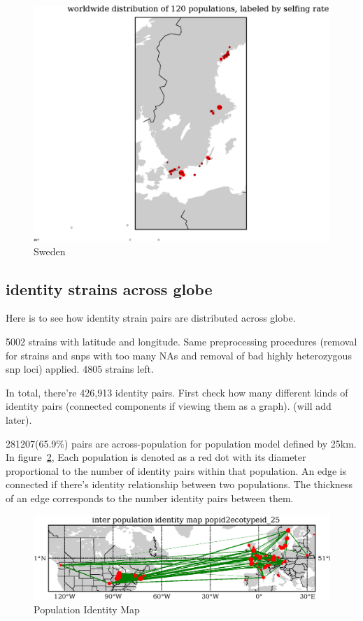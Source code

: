 \documentclass[a4paper,10pt]{article}
\begin{document}
\begin{figure}
\includegraphics[width=1\textwidth]{figures/s0829popid2ecotypeid_5_Swe_10_52_20_65_l3y1_pop_map.eps}
\caption{Sweden}\label{f19}
\end{figure}

\subsection{identity strains across globe}
Here is to see how identity strain pairs are distributed across globe.

5002 strains with latitude and longitude. Same preprocessing procedures (removal for strains and snps with too many NAs and removal of bad highly heterozygous snp loci) applied. 4805 strains left.

In total, there're 426,913 identity pairs. First check how many different kinds of identity pairs (connected components if viewing them as a graph). (will add later).

281207(65.9\%) pairs are across-population for population model defined by 25km. In figure~\ref{f22}, Each population is denoted as a red dot with its diameter proportional to the number of identity pairs within that population. An edge is connected if there's identity relationship between two populations. The thickness of an edge corresponds to the number identity pairs between them.

\begin{figure}
\includegraphics[width=1\textwidth]{figures/popid2ecotypeid_25_identity.map_site_network.eps}
\caption{Population Identity Map}\label{f22}
\end{figure}




\end{document}

